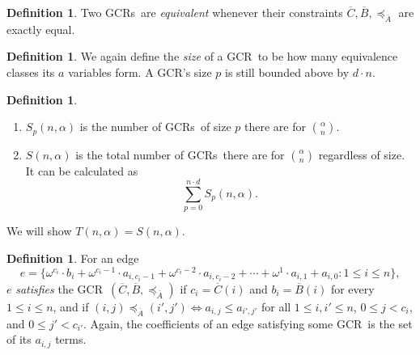 \documentclass[11pt]{article}
\newcommand{\om}{\omega}
\newcommand{\gencrulenospace}{GCR}
\newcommand{\gencrule}{\gencrulenospace~}
\newcommand{\gencrules}{\gencrulenospace s~}
\newcommand{\xleq}{\preceq_{\overline{A}}}
\newcommand{\assny}{\overline{B}}
\newcommand{\assnc}{\overline{C}}
\newcommand{\numpoints}{n}
\newcommand{\inumpoints}{i}
\newcommand{\idegr}{j}
\newcommand{\commonconst}{a}
\newcommand{\rareconst}{b}
\theoremstyle{plain}
\theoremstyle{definition}
\newtheorem{definition}[theorem]{Definition}
\begin{document}
\begin{definition}
    Two \gencrules are \textit{equivalent} whenever their constraints $\assnc, \assny, \xleq$ are
    exactly equal.
\end{definition}

\begin{definition}
We again define the \textit{size} of a \gencrule to be how many equivalence classes its $\commonconst$ variables form. A \gencrulenospace's size $p$ is still bounded above by $d \cdot \numpoints$.
\end{definition}

\begin{definition}~
\begin{enumerate}
\item 
$S_p(\numpoints,\alpha)$ is the number of \gencrules of size $p$ there are for $\binom{\alpha}{\numpoints}$. 
\item 
$S(\numpoints,\alpha)$ is the total number of \gencrules there are for $\binom{\alpha}{\numpoints}$ regardless of size. It can be calculated as $$
\sum_{p=0}^{\numpoints \cdot d} S_p(\numpoints, \alpha).
$$ 
\end{enumerate}
\end{definition}
We will show $T(\numpoints,\alpha) = S(\numpoints,\alpha)$.

\begin{definition}\label{def:gcrule-coef}
For an edge $$e=\{\om^{c_{\inumpoints}} \cdot \rareconst_{\inumpoints} + \om^{c_{\inumpoints}-1} \cdot \commonconst_{\inumpoints,c_{\inumpoints}-1} + \om^{c_{\inumpoints}-2} \cdot \commonconst_{\inumpoints,c_{\inumpoints}-2} + \cdots + \om^1 \cdot \commonconst_{\inumpoints,1} + \commonconst_{\inumpoints,0} \colon 1 \leq \inumpoints \leq \numpoints\},$$
$e$ \textit{satisfies} the \gencrule $(\assnc,\assny, \xleq)$ if $c_{\inumpoints} = \assnc(\inumpoints)$ and $\rareconst_{\inumpoints} = \assny(\inumpoints)$ for every $1 \leq \inumpoints\leq \numpoints$, and if $(\inumpoints,\idegr) \xleq (\inumpoints',\idegr') \iff \commonconst_{\inumpoints,\idegr}\leq \commonconst_{\inumpoints',\idegr'}$ for all $1 \leq \inumpoints,\inumpoints'\leq \numpoints$, $0 \leq \idegr < c_{\inumpoints},$ and $0 \leq \idegr' < c_{\inumpoints'}.$
Again, the coefficients of an edge satisfying some \gencrule is the set of its
$a_{i,j}$ terms.
\end{definition}
\end{document}
